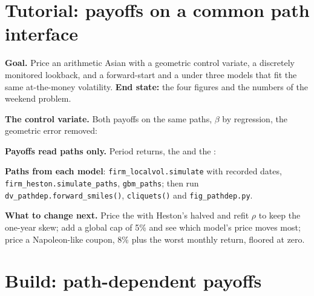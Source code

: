 \section{Tutorial: payoffs on a common path interface}\label{tut:dv:asians-lookbacks-cliquets-and-forward-starts:tut}

\begin{tutorial}
\textbf{Goal.} Price an arithmetic Asian with a geometric control variate, a discretely monitored lookback, and a
forward-start and a  under three models that fit the same at-the-money volatility. \textbf{End state:} the four
figures and the numbers of the weekend problem.
\begin{tutsteps}
\item \textbf{The control variate.} Both payoffs on the same paths, $\beta$ by regression, the geometric error removed:
\label{lst:dv:asians-lookbacks-cliquets-and-forward-starts:cv}
\item \textbf{Payoffs read paths only.} Period returns, the  and the :
\label{lst:dv:asians-lookbacks-cliquets-and-forward-starts:cliquet}
\item \textbf{Paths from each model}: \texttt{firm\_localvol.simulate} with recorded dates, \texttt{firm\_heston.simulate\_paths},
\texttt{gbm\_paths}; then run \texttt{dv\_pathdep.forward\_smiles()}, \texttt{cliquets()} and \texttt{fig\_pathdep.py}.
\end{tutsteps}
\textbf{What to change next.} Price the  with Heston's  halved and refit $\rho$ to keep the
one-year skew; add a global cap of 5\% and see which model's price moves most; price a Napoleon-like coupon, 8\% plus the
worst monthly return, floored at zero.
\end{tutorial}

\section{Build: path-dependent payoffs}\label{bld:dv:asians-lookbacks-cliquets-and-forward-starts:pathdep}


